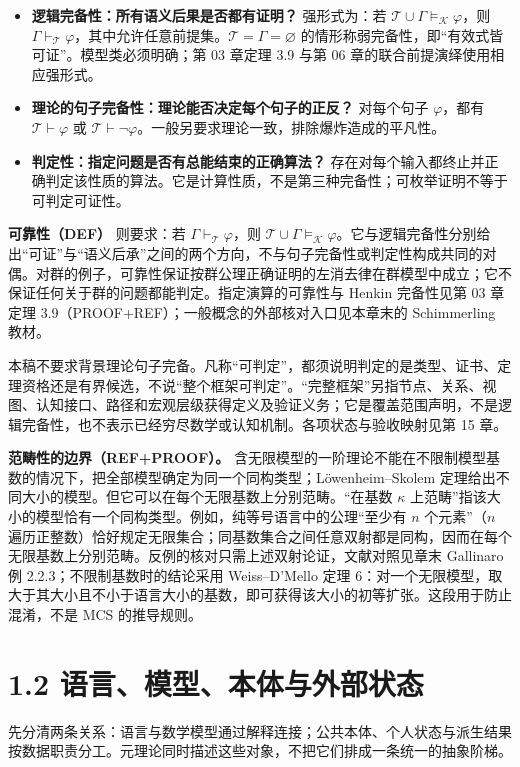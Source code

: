 \documentclass[UTF8,a4paper,zihao=-4,fontset=windows,openany]{ctexbook}
\begin{document}
\begin{itemize}
\item \textbf{逻辑完备性：所有语义后果是否都有证明？} 强形式为：若 \(\mathcal T\cup\Gamma\models_{\mathcal K}\varphi\)，则 \(\Gamma\vdash_{\mathcal T}\varphi\)，其中允许任意前提集。\(\mathcal T=\Gamma=\varnothing\) 的情形称弱完备性，即“有效式皆可证”。模型类必须明确；第 03 章定理 3.9 与第 06 章的联合前提演绎使用相应强形式。
\item \textbf{理论的句子完备性：理论能否决定每个句子的正反？} 对每个句子 \(\varphi\)，都有 \(\mathcal T\vdash\varphi\) 或 \(\mathcal T\vdash\neg\varphi\)。一般另要求理论一致，排除爆炸造成的平凡性。
\item \textbf{判定性：指定问题是否有总能结束的正确算法？} 存在对每个输入都终止并正确判定该性质的算法。它是计算性质，不是第三种完备性；可枚举证明不等于可判定可证性。
\end{itemize}
\textbf{可靠性（DEF）} 则要求：若 \(\Gamma\vdash_{\mathcal T}\varphi\)，则 \(\mathcal T\cup\Gamma\models_{\mathcal K}\varphi\)。它与逻辑完备性分别给出“可证”与“语义后承”之间的两个方向，不与句子完备性或判定性构成共同的对偶。对群的例子，可靠性保证按群公理正确证明的左消去律在群模型中成立；它不保证任何关于群的问题都能判定。指定演算的可靠性与 Henkin 完备性见第 03 章定理 3.9（PROOF+REF）；一般概念的外部核对入口见本章末的 Schimmerling 教材。

本稿不要求背景理论句子完备。凡称“可判定”，都须说明判定的是类型、证书、定理资格还是有界候选，不说“整个框架可判定”。“完整框架”另指节点、关系、视图、认知接口、路径和宏观层级获得定义及验证义务；它是覆盖范围声明，不是逻辑完备性，也不表示已经穷尽数学或认知机制。各项状态与验收映射见第 15 章。

\textbf{范畴性的边界（REF+PROOF）。} 含无限模型的一阶理论不能在不限制模型基数的情况下，把全部模型确定为同一个同构类型；Löwenheim–Skolem 定理给出不同大小的模型。但它可以在每个无限基数上分别范畴。“在基数 \(\kappa\) 上范畴”指该大小的模型恰有一个同构类型。例如，纯等号语言中的公理“至少有 \(n\) 个元素”（\(n\) 遍历正整数）恰好规定无限集合；同基数集合之间任意双射都是同构，因而在每个无限基数上分别范畴。反例的核对只需上述双射论证，文献对照见章末 Gallinaro 例 2.2.3；不限制基数时的结论采用 Weiss–D’Mello 定理 6：对一个无限模型，取大于其大小且不小于语言大小的基数，即可获得该大小的初等扩张。这段用于防止混淆，不是 MCS 的推导规则。

\section{1.2 语言、模型、本体与外部状态}
先分清两条关系：语言与数学模型通过解释连接；公共本体、个人状态与派生结果按数据职责分工。元理论同时描述这些对象，不把它们排成一条统一的抽象阶梯。
\end{document}
